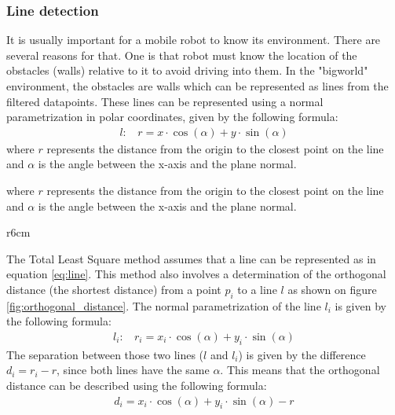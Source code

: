 \documentclass[../Head/Main.tex]{subfiles}
\begin{document}
\subsubsection{Line detection}
It is usually important for a mobile robot to know its environment. There are several reasons for that. One is that robot must know the location of the obstacles (walls) relative to it to avoid driving into them. In the "bigworld" environment, the obstacles are walls which can be represented as lines from the filtered datapoints. These lines can be represented using a normal parametrization in polar coordinates, given by the following formula:
\begin{align}
    l:~~~~r = x\cdot\cos(\alpha)+y\cdot\sin(\alpha)
    \label{eq:line}
\end{align}
where $r$ represents the distance from the origin to the closest point on the line and $\alpha$ is the angle between the x-axis and the plane normal. \par
where $r$ represents the distance from the origin to the closest point on the line and $\alpha$ is the angle between the x-axis and the plane normal\cite{textbook}. 
\par
\begin{wrapfigure}{r}{6cm}
	\vspace{-12pt}
	\centering
	
	\vspace{-5pt}
	\caption{Orthogonal distance from point $p_1$ to line $l$}
	\label{fig:orthogonal_distance}
	\vspace{-5pt}
\end{wrapfigure}
The Total Least Square method assumes that a line can be represented as in equation \ref{eq:line}. This method also involves a determination of the orthogonal distance (the shortest distance) from a point $p_i$ to a line $l$ as shown on  figure \ref{fig:orthogonal_distance}. The normal parametrization of the line $l_i$ is given by the following formula:
\begin{align}
    l_i:~~~~r_i = x_i\cdot\cos(\alpha)+y_i\cdot\sin(\alpha)
\end{align}
The separation between those two lines ($l$ and $l_i$) is given by the difference $d_i=r_i-r$, since both lines have the same $\alpha$. This means that the orthogonal distance can be described using the following formula:
\begin{align}
    d_i = x_i\cdot\cos(\alpha)+y_i\cdot\sin(\alpha) - r
\end{align}
\end{document}
